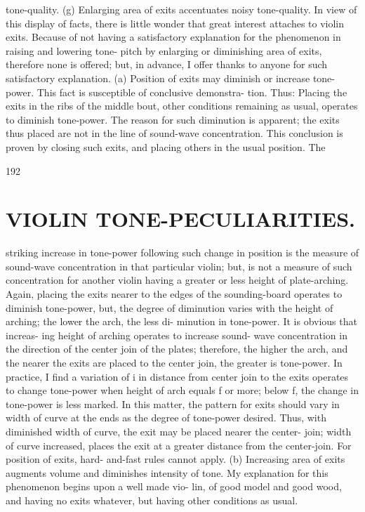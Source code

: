 \documentclass{article}
\begin{document}
tone-quality. (g) Enlarging area of exits accentuates noisy tone-quality. In view of this display of facts, there is little wonder that great interest attaches to violin exits. Because of not having a satisfactory explanation for the phenomenon in raising and lowering tone- pitch by enlarging or diminishing area of exits, therefore none is offered; but, in advance, I offer thanks to anyone for such satisfactory explanation. (a) Position of exits may diminish or increase tone-power. This fact is susceptible of conclusive demonstra- tion. Thus: Placing the exits in the ribs of the middle bout, other conditions remaining as usual, operates to diminish tone-power. The reason for such diminution is apparent; the exits thus placed are not in the line of sound-wave concentration. This conclusion is proven by closing such exits, and placing others in the usual position. The

192

\section*{VIOLIN TONE-PECULIARITIES.}
striking increase in tone-power following such change in position is the measure of sound-wave concentration in that particular violin; but, is not a measure of such concentration for another violin having a greater or less height of plate-arching. Again, placing the exits nearer to the edges of the sounding-board operates to diminish tone-power, but, the degree of diminution varies with the height of arching; the lower the arch, the less di- minution in tone-power. It is obvious that increas- ing height of arching operates to increase sound- wave concentration in the direction of the center join of the plates; therefore, the higher the arch, and the nearer the exits are placed to the center join, the greater is tone-power. In practice, I find a variation of i in distance from center join to the exits operates to change tone-power when height of arch equals f or more; below f, the change in tone-power is less marked. In this matter, the pattern for exits should vary in width of curve at the ends as the degree of tone-power desired. Thus, with diminished width of curve, the exit may be placed nearer the center- join; width of curve increased, places the exit at a greater distance from the center-join. For position of exits, hard- and-fast rules cannot apply. (b) Increasing area of exits augments volume and diminishes intensity of tone. My explanation for this phenomenon begins upon a well made vio- lin, of good model and good wood, and having no exits whatever, but having other conditions as usual.
\end{document}
